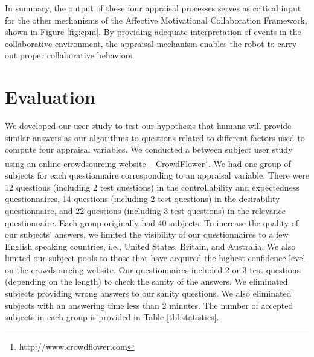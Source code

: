 \documentclass{article}
\begin{document}
In summary, the output of these four appraisal processes serves as critical
input for the other mechanisms of the Affective Motivational Collaboration
Framework, shown in Figure \ref{fig:cpm}. By providing adequate interpretation
of events in the collaborative environment, the appraisal mechanism enables the
robot to carry out proper collaborative behaviors.

\vspace{-2mm}
\section{Evaluation}
\label{sec:user-study}

We developed our user study to test our hypothesis that humans will provide
similar answers as our algorithms to questions related to different factors used
to compute four appraisal variables. We conducted a between subject user study
using an online crowdsourcing website --
CrowdFlower\footnote{http://www.crowdflower.com}. We had one group of
subjects for each questionnaire corresponding to an appraisal variable.
There were 12 questions (including 2 test questions) in the controllability and
expectedness questionnaires, 14 questions (including 2 test questions) in
the desirability questionnaire, and 22 questions (including 3 test questions) in
the relevance questionnaire. Each group originally had 40 subjects. To increase
the quality of our subjects' answers, we limited the visibility of our
questionnaires to a few English speaking countries, i.e., United States,
Britain, and Australia. We also limited our subject pools to those that have
acquired the highest confidence level on the crowdsourcing website. Our
questionnaires included 2 or 3 test questions (depending on the length) to check
the sanity of the answers. We eliminated subjects providing wrong answers to our
sanity questions. We also eliminated subjects with an answering time less than 2
minutes. The number of accepted subjects in each group is provided in Table
\ref{tbl:statistics}.
\end{document}
